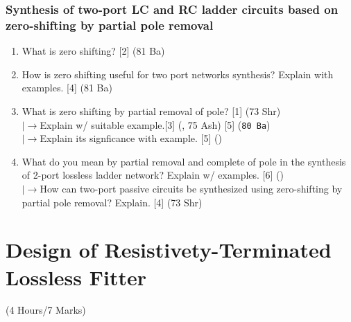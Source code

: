 \documentclass[12pt]{article}
\newcommand{\lb}{\\$\left|\rightarrow\right.$}
\begin{document}
\subsubsection{Synthesis of two-port LC and RC ladder circuits based on zero-shifting by partial pole removal}
\begin{enumerate}
	\item What is zero shifting? \hfill [2] (81 Ba)
	
	\item How is zero shifting useful for two port networks synthesis? Explain with examples. \hfill [4] (81 Ba)
	
	\item What is zero shifting by partial removal of pole? \hfill [1] (73 Shr)
	\lb Explain w/ suitable example.\hfill [3] (, 75 Ash) [5] (\texttt{80 Ba})
	\lb Explain its signficance with example. \hfill [5] ()

	\item What do you mean by partial removal and complete of pole in the synthesis of 2-port lossless ladder network? Explain w/ examples. \hfill [6] ()
	\lb How can two-port passive circuits be synthesized using zero-shifting by partial pole removal? Explain. \hfill [4] (73 Shr)
\end{enumerate}

\pagebreak
\section{Design of Resistivety-Terminated Lossless Fitter}
\begin{center}(4 Hours/7 Marks)\end{center}
\end{document}
